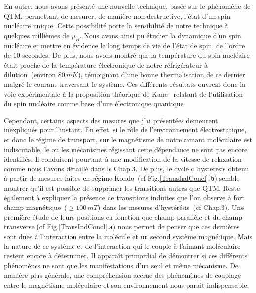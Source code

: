 En outre, nous avons présenté une nouvelle technique, basée sur le phénomène de QTM, permettant de mesurer, de manière non destructive, l'état d'un spin nucléaire unique. Cette possibilité porte la sensibilité de notre technique à quelques millièmes de $\mu_B$. Nous avons ainsi pu étudier la dynamique d'un spin nucléaire et mettre en évidence le long temps de vie de l'état de spin, de l'ordre de 10 secondes. De plus, nous avons montré que la température du spin nucléaire était proche de la température électronique de notre réfrigérateur à dilution~(environ 80$\,mK$), témoignant d'une bonne thermalisation de ce dernier malgré le courant traversant le système. Ces différents résultats ouvrent donc la voie expérimentale à la proposition théorique de Kane~\cite{Kane1998} relatant de l'utilisation du spin nucléaire comme base d'une électronique quantique.


Cependant, certains aspects des mesures que j'ai présentées demeurent inexpliqués pour l'instant. En effet, si le rôle de l’environnement électrostatique, et donc le régime de transport, sur le magnétisme de notre aimant moléculaire est indiscutable, le ou les mécanismes régissant cette dépendance ne sont pas encore identifiés. Il conduisent pourtant à une modification de la vitesse de relaxation comme nous l'avons détaillé dans le Chap.3. De plus, le cycle d'hysteresis obtenu à partir de mesures faites en régime Kondo~(cf Fig.\ref{TransIndConcl}.\textbf{b}) semble montrer qu'il est possible de supprimer les transitions autres que QTM.  Reste également à expliquer la présence de transitions induites que l'on observe à fort champ magnétique~($\geq 100\,mT$) dans les mesures d’hystérésis~(cf Chap.3). Une première étude de leurs positions en fonction que champ parallèle et du champ transverse (cf Fig.\ref{TransIndConcl}.\textbf{a}) nous permet de penser que ces dernières sont dues à l'interaction entre la molécule et un second système magnétique. Mais la nature de ce système et de l'interaction qui le couple à l'aimant moléculaire restent encore à déterminer. Il apparaît primordial de démontrer si ces différents phénomènes ne sont que les manifestations d'un seul et même mécanisme. De manière plus générale, une compréhension accrue des phénomènes de couplage entre le magnétisme moléculaire et son environnement nous parait indispensable.

